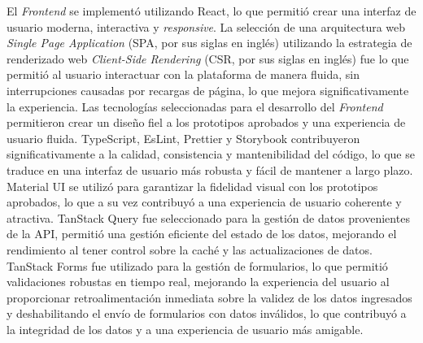 El \textit{Frontend} se implementó utilizando React, lo que permitió crear una interfaz de usuario moderna, interactiva
y \textit{responsive}.
La selección de una arquitectura web \textit{Single Page Application} (SPA, por sus siglas en inglés) utilizando la estrategia
de renderizado web \textit{Client-Side Rendering} (CSR, por sus siglas en inglés) fue lo que permitió al usuario interactuar
con la plataforma de manera fluida, sin interrupciones causadas por recargas de página, lo que mejora significativamente
la experiencia.
Las tecnologías seleccionadas para el desarrollo del \textit{Frontend} permitieron crear un diseño fiel a los prototipos
aprobados y una experiencia de usuario fluida. TypeScript, EsLint, Prettier y Storybook contribuyeron significativamente
a la calidad, consistencia y mantenibilidad del código, lo que se traduce en una interfaz de usuario más robusta y fácil
de mantener a largo plazo. Material UI se utilizó para garantizar la fidelidad visual con los prototipos aprobados, lo que
a su vez contribuyó a una experiencia de usuario coherente y atractiva. TanStack Query fue seleccionado para la gestión de
datos provenientes de la API, permitió una gestión eficiente del estado de los datos, mejorando el rendimiento al tener
control sobre la caché y las actualizaciones de datos. TanStack Forms fue utilizado para la gestión de formularios, lo que
permitió validaciones robustas en tiempo real, mejorando la experiencia del usuario al proporcionar retroalimentación
inmediata sobre la validez de los datos ingresados y deshabilitando el envío de formularios con datos inválidos,
lo que contribuyó a la integridad de los datos y a una experiencia de usuario más amigable.

